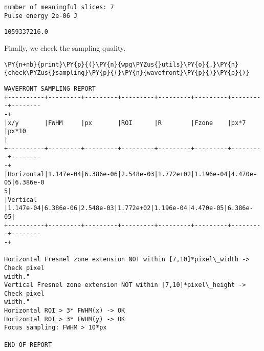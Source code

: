     \begin{center}
    \end{center}
    { \hspace*{\fill} \\}
    
    \begin{center}
    \end{center}
    { \hspace*{\fill} \\}
    
    \begin{Verbatim}[commandchars=\\\{\}]
number of meaningful slices: 7
Pulse energy 2e-06 J
    \end{Verbatim}

            \begin{tcolorbox}[breakable, size=fbox, boxrule=.5pt, pad at break*=1mm, opacityfill=0]
\begin{Verbatim}[commandchars=\\\{\}]
1059337216.0
\end{Verbatim}
\end{tcolorbox}
        
    Finally, we check the sampling quality.

    \begin{tcolorbox}[breakable, size=fbox, boxrule=1pt, pad at break*=1mm,colback=cellbackground, colframe=cellborder]
\begin{Verbatim}[commandchars=\\\{\}]
\PY{n+nb}{print}\PY{p}{(}\PY{n}{wpg\PYZus{}utils}\PY{o}{.}\PY{n}{check\PYZus{}sampling}\PY{p}{(}\PY{n}{wavefront}\PY{p}{)}\PY{p}{)}
\end{Verbatim}
\end{tcolorbox}

    \begin{Verbatim}[commandchars=\\\{\}]
WAVEFRONT SAMPLING REPORT
+----------+---------+---------+---------+---------+---------+---------+--------
-+
|x/y       |FWHM     |px       |ROI      |R        |Fzone    |px*7     |px*10
|
+----------+---------+---------+---------+---------+---------+---------+--------
-+
|Horizontal|1.147e-04|6.386e-06|2.548e-03|1.772e+02|1.196e-04|4.470e-05|6.386e-0
5|
|Vertical
|1.147e-04|6.386e-06|2.548e-03|1.772e+02|1.196e-04|4.470e-05|6.386e-05|
+----------+---------+---------+---------+---------+---------+---------+--------
-+

Horizontal Fresnel zone extension NOT within [7,10]*pixel\_width -> Check pixel
width."
Vertical Fresnel zone extension NOT within [7,10]*pixel\_height -> Check pixel
width."
Horizontal ROI > 3* FWHM(x) -> OK
Horizontal ROI > 3* FWHM(y) -> OK
Focus sampling: FWHM > 10*px

END OF REPORT
    \end{Verbatim}

